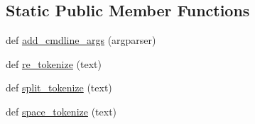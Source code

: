 \subsection*{Static Public Member Functions}
\begin{DoxyCompactItemize}
\item 
def \hyperlink{classparlai_1_1core_1_1dict_1_1DictionaryAgent_ad09f8ecf2b258ecaebce69d9cef9ff3c}{add\+\_\+cmdline\+\_\+args} (argparser)
\item 
def \hyperlink{classparlai_1_1core_1_1dict_1_1DictionaryAgent_a78edf54954bf0514e1798ce694a758fe}{re\+\_\+tokenize} (text)
\item 
def \hyperlink{classparlai_1_1core_1_1dict_1_1DictionaryAgent_a826ba5c6ff36c8ddf5d7723c50e5616d}{split\+\_\+tokenize} (text)
\item 
def \hyperlink{classparlai_1_1core_1_1dict_1_1DictionaryAgent_a437d3aacc7b55dac587643b271ba5f38}{space\+\_\+tokenize} (text)
\end{DoxyCompactItemize}
